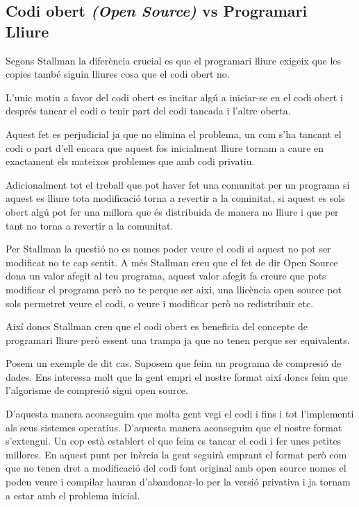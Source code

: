 \documentclass[a4paper,11pt]{scrartcl}
\begin{document}
\subsection{Codi obert \emph{(Open Source)} vs Programari Lliure}
Segons Stallman la diferència crucial es que el programari lliure exigeix
que les copies també siguin lliures cosa que el codi obert no.

L'unic motiu a favor del codi obert es incitar algú a
iniciar-se en el codi obert i després tancar el codi o tenir part del
codi tancada i l'altre oberta.

Aquest fet es perjudicial ja que no elimina el problema, un com s'ha
tancant el codi o part d'ell encara que aquest fos inicialment lliure tornam
a caure en exactament els mateixos problemes que amb codi privatiu.

Adicionalment tot el treball que pot haver fet una comunitat per un programa
si aquest es lliure tota modificació torna a revertir a la cominitat,
si aquest es sols obert algú pot fer una millora que és distribuida 
de manera no lliure i que per tant no torna a revertir a la comunitat.

Per Stallman la questió no es nomes poder veure el codi si aquest no pot
ser modificat no te cap sentit. A més Stallman creu que el fet de dir
Open Source dona un valor afegit al teu programa, aquest valor afegit
fa creure que pots modificar el programa però no te perque ser aixi,
una llicència open source pot sols permetret veure el codi, o veure i modificar
però no redistribuir etc.

Així doncs Stallman creu que el codi obert es beneficia del concepte de programari
lliure però essent una trampa ja que no tenen perque ser equivalents.

Posem un exemple de dit cas. Suposem que feim un programa de compresió de dades.
Ens interessa molt que la gent empri el nostre format així doncs feim
que l'algorisme de compresió sigui open source.

D'aquesta manera aconseguim que molta gent vegi el codi i fins i tot l'implementi
als seus sistemes operatius. D'aquesta manera aconseguim que el nostre format
s'extengui. Un cop està establert el que feim es tancar el codi i fer unes petites
millores. En aquest punt per inèrcia la gent seguirà emprant el format però
com que no tenen dret a modificació del codi font original amb open source
nomes el poden veure i compilar hauran d'abandonar-lo per la versió privativa
i ja tornam a estar amb el problema inicial.
\end{document}
